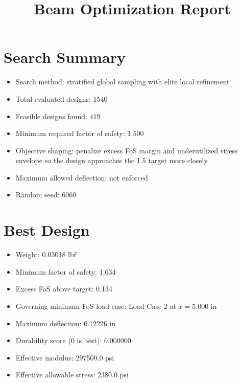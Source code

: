 \documentclass[11pt]{article}
\title{Beam Optimization Report}
\date{}
\begin{document}
\maketitle

\section*{Search Summary}
\begin{itemize}
\item Search method: stratified global sampling with elite local refinement
\item Total evaluated designs: 1540
\item Feasible designs found: 419
\item Minimum required factor of safety: 1.500
\item Objective shaping: penalize excess FoS margin and underutilized stress envelope so the design approaches the 1.5 target more closely
\item Maximum allowed deflection: not enforced
\item Random seed: 6060
\end{itemize}

\section*{Best Design}
\begin{itemize}
\item Weight: 0.03018 lbf
\item Minimum factor of safety: 1.634
\item Excess FoS above target: 0.134
\item Governing minimum-FoS load case: Load Case 2 at $x=5.000$ in
\item Maximum deflection: 0.12226 in
\item Durability score (0 is best): 0.000000
\item Effective modulus: 297500.0 psi
\item Effective allowable stress: 2380.0 psi
\end{itemize}
\end{document}
